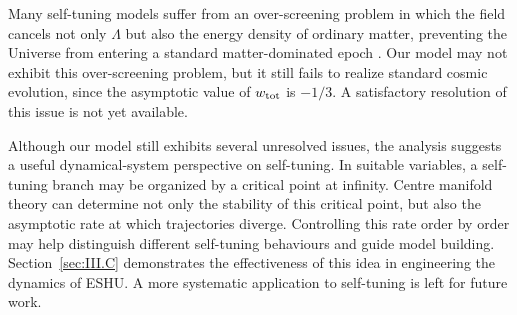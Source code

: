 \documentclass[aps,prd,twocolumn]{revtex4-2}
\newcommand\subtot{{\rm tot}}
\begin{document}
Many self-tuning models suffer from an over-screening problem in which the field cancels not only $\Lambda$ but also the energy density of ordinary matter, preventing the Universe from entering a standard matter-dominated epoch \cite{Linder2013.JCAP.12.032,MartinMoruno2015.PRD.91.084029}. Our model may not exhibit this over-screening problem, but it still fails to realize standard cosmic evolution, since the asymptotic value of $w_\subtot$ is $-1/3$. A satisfactory resolution of this issue is not yet available.

Although our model still exhibits several unresolved issues, the analysis suggests a useful dynamical-system perspective on self-tuning. In suitable variables, a self-tuning branch may be organized by a critical point at infinity. Centre manifold theory can determine not only the stability of this critical point, but also the asymptotic rate at which trajectories diverge. Controlling this rate order by order may help distinguish different self-tuning behaviours and guide model building. Section~\ref{sec:III.C} demonstrates the effectiveness of this idea in engineering the dynamics of ESHU. A more systematic application to self-tuning is left for future work.
\end{document}
